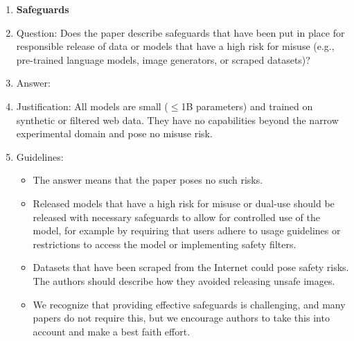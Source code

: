 \documentclass{article}
\begin{document}
\begin{enumerate}
\item {\bf Safeguards}
    \item[] Question: Does the paper describe safeguards that have been put in place for responsible release of data or models that have a high risk for misuse (e.g., pre-trained language models, image generators, or scraped datasets)?
    \item[] Answer: \answerNA{}
    \item[] Justification: All models are small ($\leq$1B parameters) and trained on synthetic or filtered web data. They have no capabilities beyond the narrow experimental domain and pose no misuse risk.
    \item[] Guidelines:
    \begin{itemize}
        \item The answer \answerNA{} means that the paper poses no such risks.
        \item Released models that have a high risk for misuse or dual-use should be released with necessary safeguards to allow for controlled use of the model, for example by requiring that users adhere to usage guidelines or restrictions to access the model or implementing safety filters.
        \item Datasets that have been scraped from the Internet could pose safety risks. The authors should describe how they avoided releasing unsafe images.
        \item We recognize that providing effective safeguards is challenging, and many papers do not require this, but we encourage authors to take this into account and make a best faith effort.
    \end{itemize}


\end{enumerate}
\end{document}
